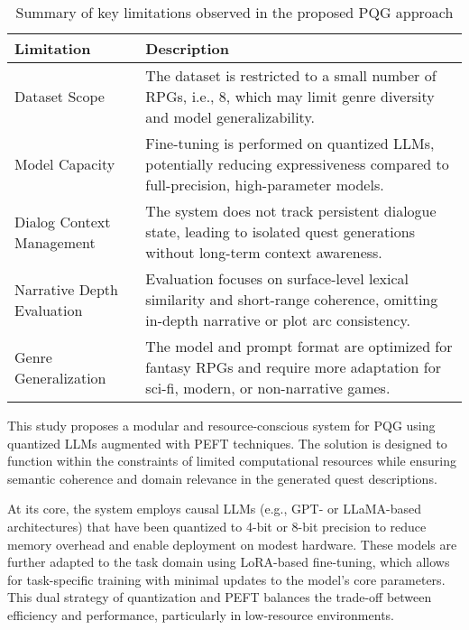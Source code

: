 \begin{table}[t]
  \centering
  \scriptsize
  \renewcommand{\arraystretch}{1.3}
  \begin{tabularx}{0.95\textwidth}{
    >{\raggedright\arraybackslash}p{5cm}
    >{\raggedright\arraybackslash}X
  }
    \toprule
    \textbf{Limitation} & \textbf{Description} \\
    \midrule
    Dataset Scope
      & The dataset is restricted to a small number of RPGs, i.e., 8, which may limit genre diversity and model generalizability. \\
    Model Capacity
      & Fine-tuning is performed on quantized LLMs, potentially reducing expressiveness compared to full-precision, high-parameter models. \\
    Dialog Context Management
      & The system does not track persistent dialogue state, leading to isolated quest generations without long-term context awareness. \\
    Narrative Depth Evaluation
      & Evaluation focuses on surface-level lexical similarity and short-range coherence, omitting in-depth narrative or plot arc consistency. \\
    Genre Generalization
      & The model and prompt format are optimized for fantasy RPGs and require more adaptation for sci-fi, modern, or non-narrative games. \\
    \bottomrule
  \end{tabularx}
  \caption{Summary of key limitations observed in the proposed PQG approach}
  \label{table:limitations}
\end{table}

This study proposes a modular and resource-conscious system for PQG using quantized
LLMs augmented with PEFT techniques. The solution is designed to function within
the constraints of limited computational resources while ensuring semantic coherence and
domain relevance in the generated quest descriptions.

At its core, the system employs causal LLMs (e.g., GPT- or LLaMA-based architectures)
that have been quantized to 4-bit or 8-bit precision to reduce memory overhead and
enable deployment on modest hardware. These models are further adapted to the task domain
using LoRA-based fine-tuning, which allows for task-specific training with minimal
updates to the model's core parameters. This dual strategy of quantization and PEFT
balances the trade-off between efficiency and performance, particularly in low-resource
environments.

